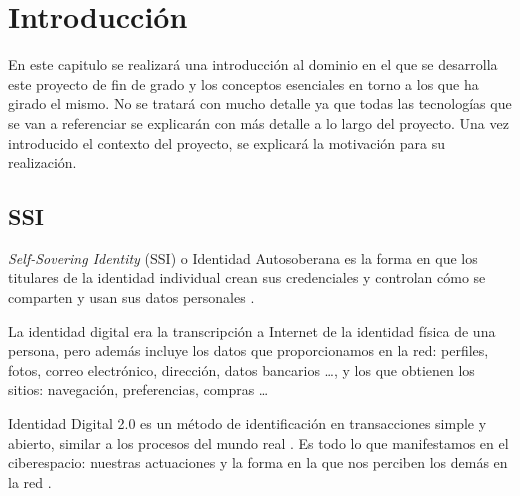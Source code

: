 \chapter{Introducción}\label{Introducción}

\thispagestyle{fancy}


En este capitulo se realizará una introducción al dominio en el que se desarrolla este proyecto de fin de grado y los conceptos esenciales en torno a los que ha girado el mismo. No se tratará con mucho detalle ya que todas las tecnologías que se van a referenciar se explicarán con más detalle a lo largo del proyecto. Una vez introducido el contexto del proyecto, se explicará la motivación para su realización.

\section{SSI}
\textit{Self-Sovering Identity} (SSI) o Identidad Autosoberana es la forma en que los titulares de la identidad individual crean sus credenciales y controlan cómo se comparten y usan sus datos personales \cite{web:ssi_wikipedia}.

La identidad digital era la transcripción a Internet de la identidad física de una persona, pero además incluye los datos que proporcionamos en la red: perfiles, fotos, correo electrónico, dirección, datos bancarios \dots,  y los que obtienen los sitios: navegación, preferencias, compras \dots

Identidad Digital 2.0 es un método de identificación en transacciones simple y abierto, similar a los procesos del mundo real \cite{web:identidad2o_wikipedia}. Es todo lo que manifestamos en el ciberespacio: nuestras actuaciones y la forma en la que nos perciben los demás en la red \cite{web:participacion}.

